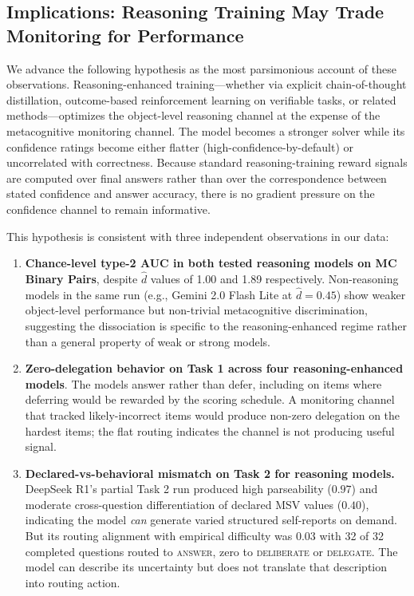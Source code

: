 \subsection{Implications: Reasoning Training May Trade Monitoring for Performance}
\label{sec:implications-mc}

We advance the following hypothesis as the most parsimonious account of these observations. Reasoning-enhanced training---whether via explicit chain-of-thought distillation, outcome-based reinforcement learning on verifiable tasks, or related methods---optimizes the object-level reasoning channel at the expense of the metacognitive monitoring channel. The model becomes a stronger solver while its confidence ratings become either flatter (high-confidence-by-default) or uncorrelated with correctness. Because standard reasoning-training reward signals are computed over final answers rather than over the correspondence between stated confidence and answer accuracy, there is no gradient pressure on the confidence channel to remain informative.

This hypothesis is consistent with three independent observations in our data:

\begin{enumerate}
    \item \textbf{Chance-level type-2 AUC in both tested reasoning models on MC Binary Pairs}, despite $\hat{d}$ values of 1.00 and 1.89 respectively. Non-reasoning models in the same run (e.g., Gemini 2.0 Flash Lite at $\hat{d} = 0.45$) show weaker object-level performance but non-trivial metacognitive discrimination, suggesting the dissociation is specific to the reasoning-enhanced regime rather than a general property of weak or strong models.

    \item \textbf{Zero-delegation behavior on Task 1 across four reasoning-enhanced models}. The models answer rather than defer, including on items where deferring would be rewarded by the scoring schedule. A monitoring channel that tracked likely-incorrect items would produce non-zero delegation on the hardest items; the flat routing indicates the channel is not producing useful signal.

    \item \textbf{Declared-vs-behavioral mismatch on Task 2 for reasoning models.} DeepSeek R1's partial Task 2 run produced high parseability ($0.97$) and moderate cross-question differentiation of declared MSV values ($0.40$), indicating the model \emph{can} generate varied structured self-reports on demand. But its routing alignment with empirical difficulty was $0.03$ with 32 of 32 completed questions routed to \textsc{answer}, zero to \textsc{deliberate} or \textsc{delegate}. The model can describe its uncertainty but does not translate that description into routing action.
\end{enumerate}

